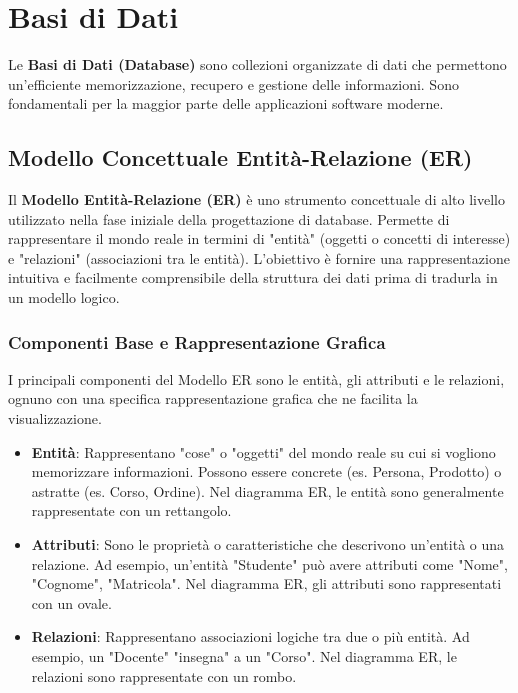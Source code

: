 \chapter{Basi di Dati}

Le \textbf{Basi di Dati (Database)} sono collezioni organizzate di dati che permettono un'efficiente memorizzazione, recupero e gestione delle informazioni. Sono fondamentali per la maggior parte delle applicazioni software moderne.

\section{Modello Concettuale Entità-Relazione (ER)}
Il \textbf{Modello Entità-Relazione (ER)} è uno strumento concettuale di alto livello utilizzato nella fase iniziale della progettazione di database. Permette di rappresentare il mondo reale in termini di "entità" (oggetti o concetti di interesse) e "relazioni" (associazioni tra le entità). L'obiettivo è fornire una rappresentazione intuitiva e facilmente comprensibile della struttura dei dati prima di tradurla in un modello logico.

\subsection{Componenti Base e Rappresentazione Grafica}
I principali componenti del Modello ER sono le entità, gli attributi e le relazioni, ognuno con una specifica rappresentazione grafica che ne facilita la visualizzazione.
\begin{itemize}
    \item \textbf{Entità}: Rappresentano "cose" o "oggetti" del mondo reale su cui si vogliono memorizzare informazioni. Possono essere concrete (es. Persona, Prodotto) o astratte (es. Corso, Ordine). Nel diagramma ER, le entità sono generalmente rappresentate con un rettangolo.
    \item \textbf{Attributi}: Sono le proprietà o caratteristiche che descrivono un'entità o una relazione. Ad esempio, un'entità "Studente" può avere attributi come "Nome", "Cognome", "Matricola". Nel diagramma ER, gli attributi sono rappresentati con un ovale.
    \item \textbf{Relazioni}: Rappresentano associazioni logiche tra due o più entità. Ad esempio, un "Docente" "insegna" a un "Corso". Nel diagramma ER, le relazioni sono rappresentate con un rombo.
\end{itemize}

